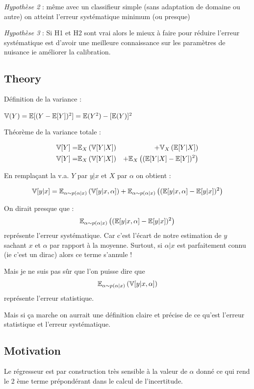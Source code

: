 \emph{Hypothèse 2} : même avec un classifieur simple (sans adaptation de domaine ou autre) on atteint l'erreur systématique minimum (ou presque)

\emph{Hypothèse 3} : Si H1 et H2 sont vrai alors le mieux à faire pour réduire l'erreur systématique est d'avoir une meilleure connaissance sur les paramètres de nuisance ie améliorer la calibration.

\subsection{Theory} %
\label{sub:theory}


Définition de la variance :

$\mathbb{V}(Y) = \mathbb{E}[(Y - \mathbb{E}[Y])^2] = \mathbb{E}(Y^2) - [\mathbb{E}(Y)]^2$

Théorème de la variance totale \needcite :

\begin{eqnarray}
    \mathbb{V}[Y] =& \mathbb{E}_X \left (\mathbb{V}[Y|X] \right ) &+ \mathbb{V}_X \left (\mathbb{E}[Y|X]\right ) \\
    \mathbb{V}[Y] =& \mathbb{E}_X \left (\mathbb{V}[Y|X] \right ) &+ \mathbb{E}_X \left ( (\mathbb{E} [Y|X]  - \mathbb{E}[Y])^2\right )
\end{eqnarray}


En remplaçant la v.a. $Y$ par $y|x$ et $X$ par $\alpha$ on obtient :

$$
\mathbb{V}[y|x] = \mathbb{E}_{\alpha \sim p(\alpha|x)} \left (\mathbb{V}[y|x, \alpha] \right ) + \mathbb{E}_{\alpha \sim p(\alpha|x)} \left ( (\mathbb{E} [y|x, \alpha]  - \mathbb{E}[y|x])^2\right )
$$


On dirait presque que : 
$$\mathbb{E}_{\alpha \sim p(\alpha|x)} \left ((\mathbb{E} [y|x, \alpha]  - \mathbb{E}[y|x])^2\right )$$
représente l'erreur systématique. 
Car c'est l'écart de notre estimation de $y$ sachant $x$ et $\alpha$ par rapport à la moyenne.
Surtout, si $\alpha|x$ est parfaitement connu (ie c'est un dirac) alors ce terme s'annule !

Mais je ne suis pas sûr que l'on puisse dire que
$$\mathbb{E}_{\alpha \sim p(\alpha|x)} \left (\mathbb{V}[y|x, \alpha] \right )$$
représente l'erreur statistique.

Mais si ça marche on aurrait une définition claire et précise de ce qu'est l'erreur statistique et l'erreur systématique.


\subsection{Motivation} %
\label{sub:motivation}

Le régresseur est par construction très sensible à la valeur de $\alpha$ donné ce qui rend le 2 ème terme prépondérant dans le calcul de l'incertitude.

